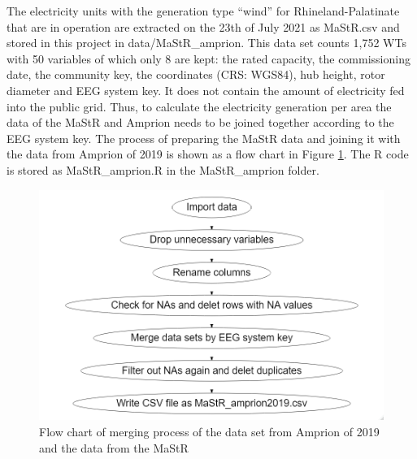 \documentclass[a4paper,11pt]{article}
\begin{document}
The electricity units with the generation type ``wind'' for Rhineland-Palatinate that are in operation are extracted on the 23th of July 2021 as MaStR.csv and stored in this project in data/MaStR\_amprion. This data set counts 1,752 WTs with 50 variables of which only 8 are kept: the rated capacity, the commissioning date, the community key, the coordinates (CRS: WGS84), hub height, rotor diameter and EEG system key. It does not contain the amount of electricity fed into the public grid. Thus, to calculate the electricity generation per area the data of the MaStR and Amprion needs to be joined together according to the EEG system key. The process of preparing the MaStR data and joining it with the data from Amprion of 2019 is shown as a flow chart in Figure \ref{fig:merge}. The R code is stored as MaStR\_amprion.R in the MaStR\_amprion folder.
\begin{figure}[H]

{\centering \includegraphics[width=0.7\linewidth]{data/MaStR_amprion_join/mergeflow} 

}

\caption{Flow chart of merging process of the data set from Amprion of 2019 and the data from the MaStR}\label{fig:merge}
\end{figure}
\end{document}
